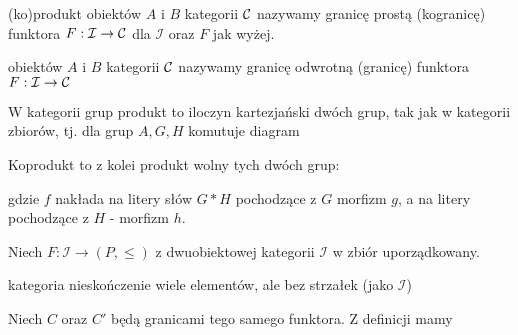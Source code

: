 {\begin{definition}{(ko)produkt}{}
   obiektów $A$ i $B$ kategorii $\mathcal{C}$ nazywamy granicę prostą (kogranicę) funktora $F:\mathcal{I}\to \mathcal{C}$ dla $\mathcal{I}$ oraz $F$ jak wyżej.

   obiektów $A$ i $B$ kategorii $\mathcal{C}$ nazywamy granicę odwrotną (granicę) funktora $F:\mathcal{I}\to\mathcal{C}$
\end{definition}

\begin{example}[m]
  \item W kategorii grup produkt to iloczyn kartezjański dwóch grup, tak jak w kategorii zbiorów, tj. dla grup $A,G,H$ komutuje diagram
    \begin{center}
    \end{center}
    Koprodukt to z kolei produkt wolny tych dwóch grup:
\begin{center}
\end{center}
gdzie $f$ nakłada na litery słów $G\ast H$ pochodzące z $G$ morfizm $g$, a na litery pochodzące z $H$ - morfizm $h$.
  \item Niech $F:\mathcal{I}\to (P, \leq)$ z dwuobiektowej kategorii $\mathcal{I}$ w zbiór uporządkowany.
\end{example}

kategoria nieskończenie wiele elementów, ale bez strzałek (jako $\mathcal{I}$)
 

Niech $C$ oraz $C'$ będą granicami tego samego funktora. Z definicji mamy
\begin{center}
\end{center}

}

